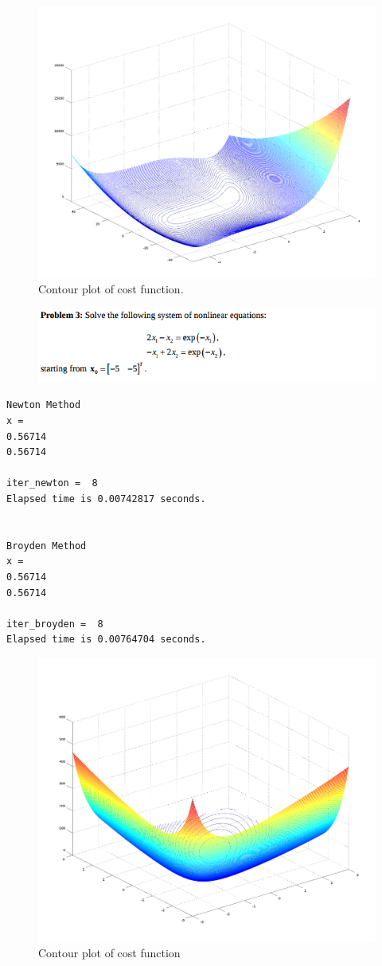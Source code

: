 \documentclass[eng,openany]{mgr}
\begin{document}
\begin{figure}[h]
\centering
\includegraphics[width=0.7\linewidth]{screenshot004}
\caption{Contour plot of cost function.}
\label{fig:screenshot004}
\end{figure}
\clearpage



\begin{figure}[h]
\centering
\includegraphics[width=0.7\linewidth]{screenshot005}
\label{fig:screenshot005}
\end{figure}
\begin{lstlisting}
Newton Method
x =
0.56714
0.56714

iter_newton =  8
Elapsed time is 0.00742817 seconds.


Broyden Method
x =
0.56714
0.56714

iter_broyden =  8
Elapsed time is 0.00764704 seconds.
\end{lstlisting}
\begin{figure}[h]
\centering
\includegraphics[width=0.7\linewidth]{screenshot006}
\caption{Contour plot of cost function}
\label{fig:screenshot006}
\end{figure}
\end{document}
